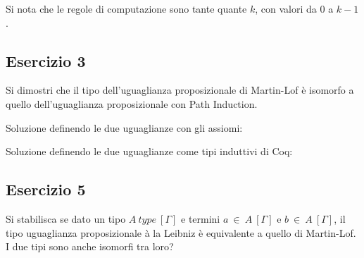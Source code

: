 Si nota che le regole di computazione sono tante quante $k$, con valori da $0$ a $k-1$.

\subsection{Esercizio 3}
\begin{thm}
	Si dimostri che il tipo dell'uguaglianza proposizionale di Martin-Lof è isomorfo a quello dell'uguaglianza proposizionale con Path Induction.
\end{thm}
Soluzione definendo le due uguaglianze con gli assiomi:


Soluzione definendo le due uguaglianze come tipi induttivi di Coq:


\subsection{Esercizio 5}
\begin{thm}
	Si stabilisca se dato un tipo $A~type~[\Gamma]$ e termini $a~\in~A~[\Gamma]$ e $b~\in~A~[\Gamma]$, il tipo uguaglianza proposizionale à la Leibniz è equivalente a quello di Martin-Lof. I due tipi sono anche isomorfi tra loro?
\end{thm}
